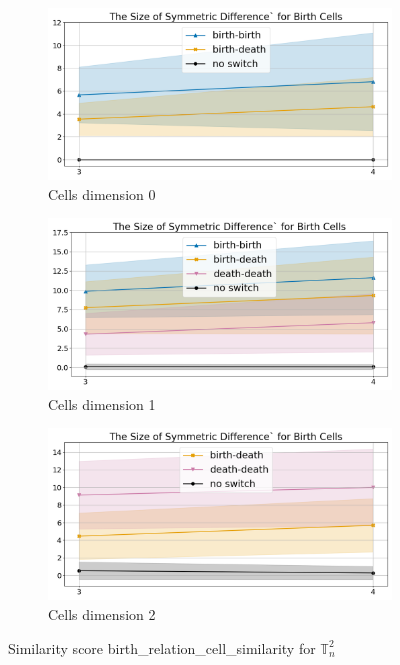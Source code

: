 \documentclass{article}
\begin{document}
\begin{figure}[htbp]
\centering
\begin{subfigure}[b]{0.3\textwidth}
    \includegraphics[width=\linewidth]{pics/torus-transpositions-extended/score-birth-relation-cell-similarity-complex-dim2-transpositions-dim0.png}
    \caption{Cells dimension 0}
    \label{fig:birthrelationcellsimilaritycomplex2cells0}
\end{subfigure}
\hfill
\begin{subfigure}[b]{0.3\textwidth}
    \includegraphics[width=\linewidth]{pics/torus-transpositions-extended/score-birth-relation-cell-similarity-complex-dim2-transpositions-dim1.png}
    \caption{Cells dimension 1}
    \label{fig:birthrelationcellsimilaritycomplex2cells1}
\end{subfigure}
\hfill
\begin{subfigure}[b]{0.3\textwidth}
    \includegraphics[width=\linewidth]{pics/torus-transpositions-extended/score-birth-relation-cell-similarity-complex-dim2-transpositions-dim2.png}
    \caption{Cells dimension 2}
    \label{fig:birthrelationcellsimilaritycomplex2cells2}
\end{subfigure}
\caption{Similarity score birth\_relation\_cell\_similarity for $\mathbb{T}_n^{2}$}
\label{fig:birthrelationcellsimilaritycomplex2}
\end{figure}
\end{document}
